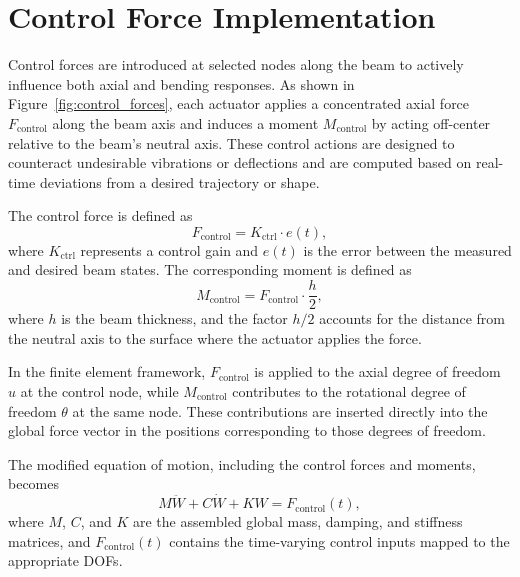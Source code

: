 \documentclass{article}
\begin{document}
	
	
	
	
	\section{Control Force Implementation}
	Control forces are introduced at selected nodes along the beam to actively influence both axial and bending responses. As shown in Figure~\ref{fig:control_forces}, each actuator applies a concentrated axial force \( F_{\text{control}} \) along the beam axis and induces a moment \( M_{\text{control}} \) by acting off-center relative to the beam’s neutral axis. These control actions are designed to counteract undesirable vibrations or deflections and are computed based on real-time deviations from a desired trajectory or shape.
	
	The control force is defined as
	\begin{equation}
		F_{\text{control}} = K_{\text{ctrl}} \cdot e(t),
	\end{equation}
	where \( K_{\text{ctrl}} \) represents a control gain and \( e(t) \) is the error between the measured and desired beam states. The corresponding moment is defined as
	\begin{equation}
		M_{\text{control}} = F_{\text{control}} \cdot \frac{h}{2},
	\end{equation}
	where \( h \) is the beam thickness, and the factor \( h/2 \) accounts for the distance from the neutral axis to the surface where the actuator applies the force.
	
	In the finite element framework, \( F_{\text{control}} \) is applied to the axial degree of freedom \( u \) at the control node, while \( M_{\text{control}} \) contributes to the rotational degree of freedom \( \theta \) at the same node. These contributions are inserted directly into the global force vector in the positions corresponding to those degrees of freedom.
	
	The modified equation of motion, including the control forces and moments, becomes
	\begin{equation}
		M \ddot{W} + C \dot{W} + K W = F_{\text{control}}(t),
	\end{equation}
	where \( M \), \( C \), and \( K \) are the assembled global mass, damping, and stiffness matrices, and \( F_{\text{control}}(t) \) contains the time-varying control inputs mapped to the appropriate DOFs.
	
\end{document}
